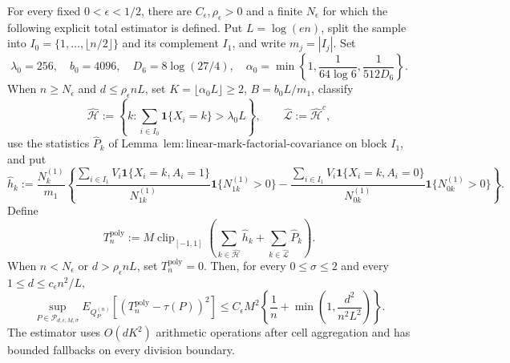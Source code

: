 For every fixed \(0<\epsilon<1/2\), there are \(C_{\epsilon},\rho_{\epsilon}>0\) and a finite \(N_{\epsilon}\) for which the following explicit total estimator is defined.  Put \(L=\log(en)\), split the sample into \(I_0=\{1,\ldots,\lfloor n/2\rfloor\}\) and its complement \(I_1\), and write \(m_j=|I_j|\).  Set
\[
 \lambda_0=256,\quad b_0=4096,\quad D_6=8\log(27/4),\quad
 \alpha_0=\min\left\{1,\frac1{64\log6},\frac1{512D_6}\right\}.
\]
When \(n\ge N_{\epsilon}\) and \(d\le\rho_{\epsilon}nL\), set \(K=\lfloor\alpha_0L\rfloor\ge2\), \(B=b_0L/m_1\), classify
\[
 \widehat{\mathcal H}:=\left\{k:\sum_{i\in I_0}\mathbf 1\{X_i=k\}>\lambda_0L\right\},
 \qquad \widehat{\mathcal L}:=\widehat{\mathcal H}^{c},
\]
use the statistics \(\widehat P_k\) of Lemma~\(\mathrm{lem:linear\text{-}mark\text{-}factorial\text{-}covariance}\) on block \(I_1\), and put
\[
 \widehat h_k:=\frac{N_k^{(1)}}{m_1}\left\{
 \frac{\sum_{i\in I_1}V_i\mathbf 1\{X_i=k,A_i=1\}}{N_{1k}^{(1)}}\mathbf 1\{N_{1k}^{(1)}>0\}
 -\frac{\sum_{i\in I_1}V_i\mathbf 1\{X_i=k,A_i=0\}}{N_{0k}^{(1)}}\mathbf 1\{N_{0k}^{(1)}>0\}
 \right\}.
\]
Define
\[
 T_n^{\mathrm{poly}}:=M\operatorname{clip}_{[-1,1]}\!\left(
 \sum_{k\in\widehat{\mathcal H}}\widehat h_k+
 \sum_{k\in\widehat{\mathcal L}}\widehat P_k\right).
\]
When \(n<N_{\epsilon}\) or \(d>\rho_{\epsilon}nL\), set \(T_n^{\mathrm{poly}}=0\).  Then, for every \(0\le\sigma\le2\) and every \(1\le d\le c_{\epsilon}n^2/L\),
\[
 \sup_{P\in\mathcal P_{d,\epsilon,M,\sigma}}
 E_{Q_P^{(n)}}[(T_n^{\mathrm{poly}}-\tau(P))^2]
 \le C_{\epsilon}M^2\left\{\frac1n+\min\left(1,\frac{d^2}{n^2L^2}\right)\right\}.
\]
The estimator uses \(O(dK^2)\) arithmetic operations after cell aggregation and has bounded fallbacks on every division boundary.